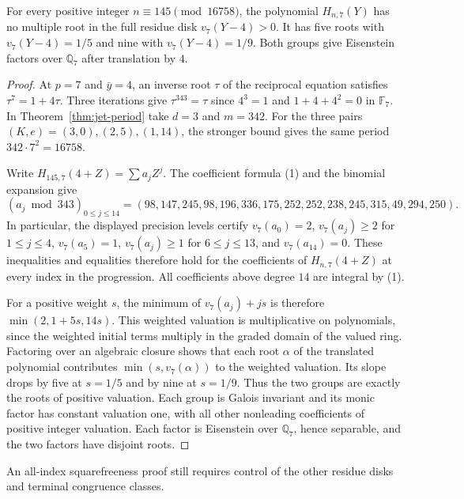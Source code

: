 \documentclass[11pt]{article}
\begin{document}
\begin{corollary}\label{cor:145}
For every positive integer $n\equiv145\pmod{16758}$, the polynomial
$H_{n,7}(Y)$ has no multiple root in the full residue disk
$v_7(Y-4)>0$. It has five roots with $v_7(Y-4)=1/5$ and nine with $v_7(Y-4)=1/9$. Both groups give
Eisenstein factors over $\mathbb Q_7$ after translation by $4$.
\end{corollary}
\begin{proof}
At $p=7$ and $\bar y=4$, an inverse root $\tau$ of the reciprocal
equation satisfies $\tau^7=1+4\tau$.
Three iterations give $\tau^{343}=\tau$ since
$4^3=1$ and $1+4+4^2=0$ in $\mathbb F_7$.
In Theorem~\ref{thm:jet-period} take $d=3$ and $m=342$.
For the three pairs $(K,e)=(3,0),(2,5),(1,14)$, the stronger bound
gives the same period $342\cdot7^2=16758$.

Write $H_{145,7}(4+Z)=\sum a_j Z^j$.
The coefficient formula (1) and the binomial expansion give
\[
 (a_j\bmod343)_{0\le j\le14}=
 (98,147,245,98,196,336,175,252,252,238,245,315,49,294,250).
\]
In particular, the displayed precision levels certify $v_7(a_0)=2$,
$v_7(a_j)\ge2$ for $1\le j\le4$, $v_7(a_5)=1$,
$v_7(a_j)\ge1$ for $6\le j\le13$, and $v_7(a_{14})=0$.
These inequalities and equalities therefore hold for the coefficients
of $H_{n,7}(4+Z)$ at every index in the progression.
All coefficients above degree $14$ are integral by (1).

For a positive weight $s$, the minimum of $v_7(a_j)+js$ is therefore
$\min(2,1+5s,14s)$.
This weighted valuation is multiplicative on polynomials, since
the weighted initial terms multiply in the graded domain of the
valued ring. Factoring over an algebraic closure shows that each
root $\alpha$ of the translated polynomial contributes
$\min(s,v_7(\alpha))$ to the weighted valuation.
Its slope drops by five at $s=1/5$ and by nine at $s=1/9$.
Thus the two groups are exactly the roots of positive valuation.
Each group is Galois invariant and its monic factor has constant
valuation one, with all other nonleading coefficients of positive
integer valuation. Each factor is Eisenstein over $\mathbb Q_7$,
hence separable, and the two factors have disjoint roots.
\end{proof}

An all-index squarefreeness proof still requires control of the other
residue disks and terminal congruence classes.
\end{document}
